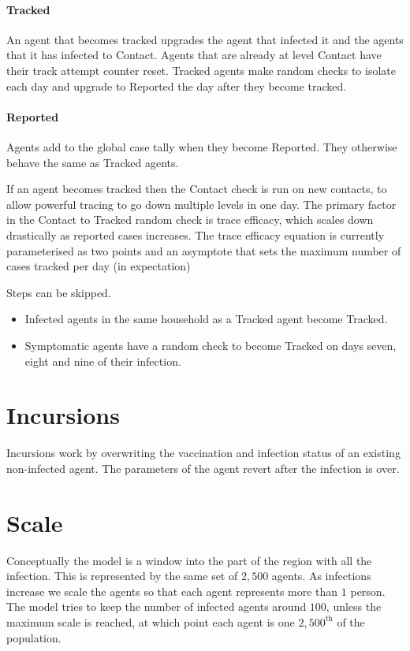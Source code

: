 \documentclass[]{article}
\begin{document}
\paragraph{Tracked} An agent that becomes tracked upgrades the agent that infected it and the agents that it has infected to Contact. Agents that are already at level Contact have their track attempt counter reset. Tracked agents make random checks to isolate each day and upgrade to Reported the day after they become tracked.

\paragraph{Reported} Agents add to the global case tally when they become Reported. They otherwise behave the same as Tracked agents.

If an agent becomes tracked then the Contact check is run on new contacts, to allow powerful tracing to go down multiple levels in one day. The primary factor in the Contact to Tracked random check is trace efficacy, which scales down drastically as reported cases increases. The trace efficacy equation is currently parameterised as two points and an asymptote that sets the maximum number of cases tracked per day (in expectation)

Steps can be skipped.
\begin{itemize}
	\item Infected agents in the same household as a Tracked agent become Tracked.
	\item Symptomatic agents have a random check to become Tracked on days seven, eight and nine of their infection.
\end{itemize}

\section{Incursions}
Incursions work by overwriting the vaccination and infection status of an existing non-infected agent. The parameters of the agent revert after the infection is over.

\section{Scale}
Conceptually the model is a window into the part of the region with all the infection. This is represented by the same set of $2,500$ agents. As infections increase we scale the agents so that each agent represents more than $1$ person. The model tries to keep the number of infected agents around $100$, unless the maximum scale is reached, at which point each agent is one $2,500^{\text{th}}$ of the population.
\end{document}
